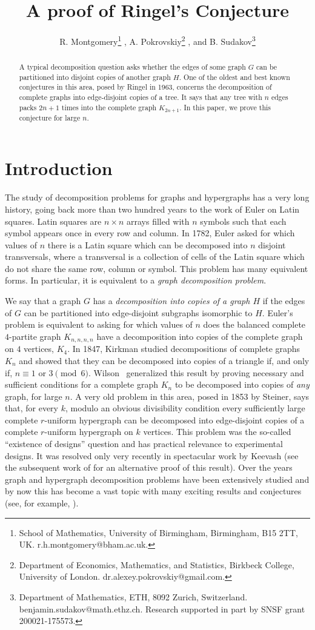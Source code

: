 \documentclass{article}
\date{}
\title{\vspace{-0.7cm} A proof of Ringel's Conjecture}
\author{R. Montgomery\thanks{School of Mathematics,
University of Birmingham,
Birmingham,
B15 2TT,
UK. r.h.montgomery@bham.ac.uk.}
, A. Pokrovskiy\thanks{Department of Economics, Mathematics, and Statistics, Birkbeck College, University of London. dr.alexey.pokrovskiy@gmail.com.}
, and B. Sudakov\thanks{Department of Mathematics, ETH, 8092 Zurich, Switzerland. benjamin.sudakov@math.ethz.ch. Research supported in part by SNSF grant 200021-175573.}
}
\theoremstyle{definition}
\begin{document}
\maketitle

\begin{abstract}
A typical decomposition question asks whether the edges of some graph $G$ can be partitioned into disjoint copies of another graph $H$.
One of the oldest and best known conjectures in this area, posed by Ringel in 1963, concerns the decomposition of complete graphs into edge-disjoint copies of a tree.
It says that any tree with $n$ edges packs $2n+1$ times into the complete graph $K_{2n+1}$.
In this paper, we prove this conjecture for large $n$.
\end{abstract}



\section{Introduction}\label{intro}
The study of decomposition problems for graphs and hypergraphs has a very long history, going back more than two hundred years to the work of Euler on Latin squares. Latin squares are $n \times n$  arrays filled with $n$ symbols such that each symbol appears once in every row and column.
In 1782, Euler asked for which values of $n$ there is a Latin square which can be decomposed into $n$ disjoint transversals, where a transversal is a collection of cells of the Latin square which do not share the same row, column or symbol.
This problem has many equivalent forms. In particular, it is equivalent to a \emph{graph decomposition problem}.

We say that a graph $G$ has a \emph{decomposition into copies of a graph $H$} if the edges of $G$ can be partitioned into edge-disjoint subgraphs isomorphic to $H$. Euler's problem is equivalent to asking for which values of $n$ does the balanced complete $4$-partite graph $K_{n,n,n,n}$ have a decomposition into copies of the complete graph on $4$ vertices, $K_4$.
In 1847, Kirkman studied decompositions of complete graphs $K_n$ and showed that they can be decomposed into copies of a triangle if, and only if, $n\equiv 1 \text{ or } 3 \pmod 6$. Wilson~\cite{wilson1975decompositions} generalized this result by proving necessary and sufficient conditions for a complete graph $K_n$ to be decomposed into copies of \emph{any} graph, for large $n$.
A very old problem in this area, posed in 1853 by Steiner, says that, for every $k$, modulo an obvious divisibility condition every sufficiently large complete $r$-uniform hypergraph can be decomposed into edge-disjoint copies of a complete $r$-uniform hypergraph on $k$ vertices. This problem was the so-called ``existence of designs'' question and has practical relevance to experimental designs. It was resolved only very recently in spectacular
work by Keevash \cite{keevash} (see the subsequent work of \cite{glock-all} for an alternative proof of this result). Over the years graph and hypergraph decomposition problems have been extensively studied and
by now this has become a vast topic with many exciting results and conjectures (see, for example, \cite{gallian2009dynamic,wozniak2004packing,yap1988packing}).
\end{document}
